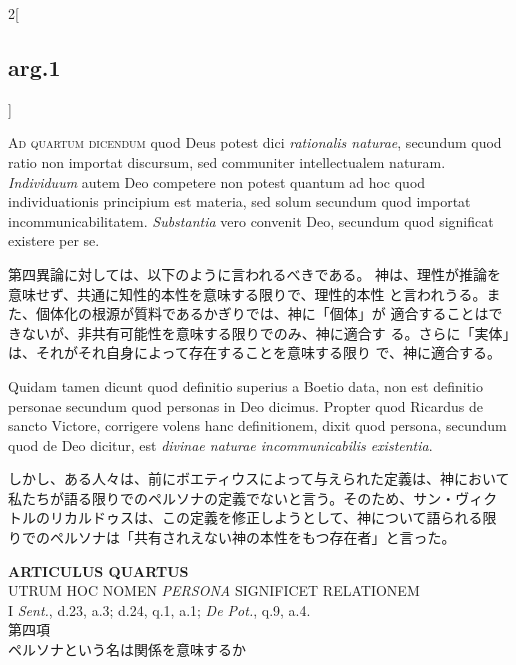 \documentclass[paper=a4paper,fontsize=10pt,jafontsize=9pt,titlepage]{jlreq}
\begin{document}
\begin{paracol}{2}[\subsection{arg.1}]
\switchcolumn*[\subsection{ad.4}]

{\scshape Ad quartum dicendum} quod Deus potest dici {\itshape rationalis naturae}, secundum
quod ratio non importat discursum, sed communiter intellectualem
naturam. {\itshape Individuum} autem Deo competere non potest quantum ad hoc quod
individuationis principium est materia, sed solum secundum quod importat
incommunicabilitatem. {\itshape Substantia} vero convenit Deo, secundum quod
significat existere per se.

\switchcolumn

第四異論に対しては、以下のように言われるべきである。
神は、理性が推論を意味せず、共通に知性的本性を意味する限りで、理性的本性
 と言われうる。また、個体化の根源が質料であるかぎりでは、神に「個体」が
 適合することはできないが、非共有可能性を意味する限りでのみ、神に適合す
 る。さらに「実体」は、それがそれ自身によって存在することを意味する限り
 で、神に適合する。

\switchcolumn*

Quidam tamen dicunt quod definitio superius
a Boetio data, non est definitio personae secundum quod personas in Deo
dicimus. Propter quod Ricardus de sancto Victore, corrigere volens hanc
definitionem, dixit quod persona, secundum quod de Deo dicitur, est
{\itshape divinae naturae incommunicabilis existentia}.

\switchcolumn

しかし、ある人々は、前にボエティウスによって与えられた定義は、神において
 私たちが語る限りでのペルソナの定義でないと言う。そのため、サン・ヴィク
 トルのリカルドゥスは、この定義を修正しようとして、神について語られる限
 りでのペルソナは「共有されえない神の本性をもつ存在者」と言った。

\end{paracol}
\newpage
{}
{}
\setcounter{section}{4}
\setcounter{subsection}{0}





\begin{center}
 {\Large {\bfseries ARTICULUS QUARTUS}}\\
 {\large UTRUM HOC NOMEN {\itshape PERSONA} SIGNIFICET RELATIONEM}\\
 {\footnotesize I {\itshape Sent.}, d.23, a.3; d.24, q.1, a.1; {\itshape
 De Pot.}, q.9, a.4.}\\
 {\Large 第四項\\ペルソナという名は関係を意味するか}
\end{center}
\end{document}

